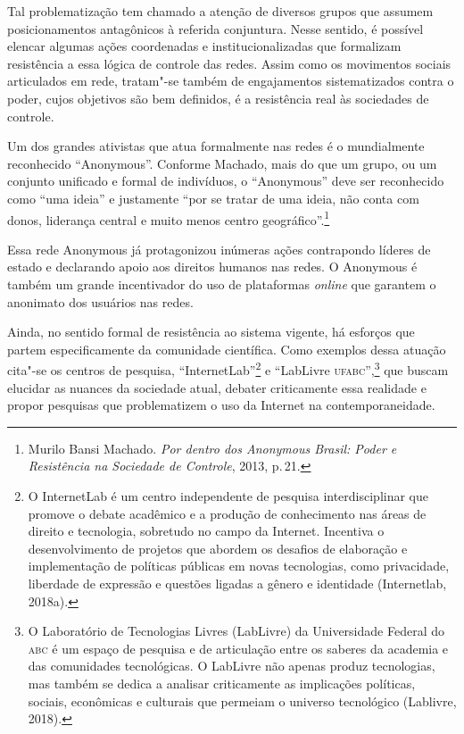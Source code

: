 Tal problematização tem chamado a atenção de diversos grupos que assumem
posicionamentos antagônicos à referida conjuntura. Nesse sentido, é
possível elencar algumas ações coordenadas e institucionalizadas que
formalizam resistência a essa lógica de controle das redes. Assim como
os movimentos sociais articulados em rede, tratam"-se também de
engajamentos sistematizados contra o poder, cujos objetivos são bem
definidos, é a resistência real às sociedades de controle.

Um dos grandes ativistas que atua formalmente nas redes é o mundialmente
reconhecido ``Anonymous''. Conforme Machado, mais do que um
grupo, ou um conjunto unificado e formal de indivíduos, o ``Anonymous''
deve ser reconhecido como ``uma ideia'' e justamente ``por se tratar de
uma ideia, não conta com donos, liderança central e muito menos centro
geográfico''.\footnote{Murilo Bansi Machado. \emph{Por dentro dos Anonymous Brasil: Poder e
Resistência na Sociedade de Controle}, 2013, p.\,21.}

Essa rede Anonymous já protagonizou inúmeras ações contrapondo líderes
de estado e declarando apoio aos direitos humanos nas redes. O Anonymous
é também um grande incentivador do uso de plataformas \emph{online} que
garantem o anonimato dos usuários nas redes.

Ainda, no sentido formal de resistência ao sistema vigente, há esforços
que partem especificamente da comunidade científica. Como exemplos dessa
atuação cita"-se os centros de pesquisa, ``InternetLab''\footnote{O
  InternetLab é um centro independente de pesquisa interdisciplinar que
  promove o debate acadêmico e a produção de conhecimento nas áreas de
  direito e tecnologia, sobretudo no campo da Internet. Incentiva o
  desenvolvimento de projetos que abordem os desafios de elaboração e
  implementação de políticas públicas em novas tecnologias, como
  privacidade, liberdade de expressão e questões ligadas a gênero e
  identidade (Internetlab, 2018a).} e ``LabLivre \textsc{ufabc}'',\footnote{O
  Laboratório de Tecnologias Livres (LabLivre) da Universidade Federal
  do \textsc{abc} é um espaço de pesquisa e de articulação entre os saberes da
  academia e das comunidades tecnológicas. O LabLivre não apenas produz
  tecnologias, mas também se dedica a analisar criticamente as
  implicações políticas, sociais, econômicas e culturais que permeiam o
  universo tecnológico (Lablivre, 2018).} que buscam elucidar as
nuances da sociedade atual, debater criticamente essa realidade e propor
pesquisas que problematizem o uso da Internet na contemporaneidade.

